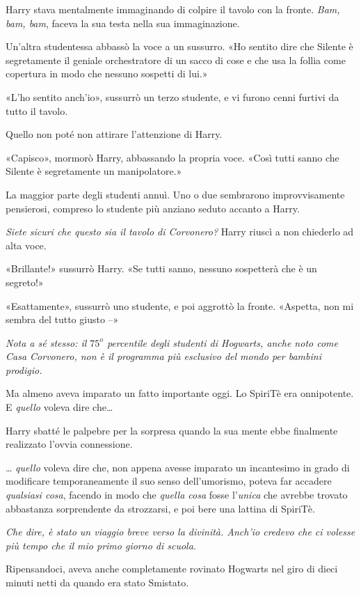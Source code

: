 Harry stava mentalmente immaginando di colpire il tavolo con la fronte. \textit{Bam, bam, bam}, faceva la sua testa nella sua immaginazione.

Un’altra studentessa abbassò la voce a un sussurro. «Ho sentito dire che Silente è segretamente il geniale orchestratore di un sacco di cose e che usa la follia come copertura in modo che nessuno sospetti di lui.»

«L’ho sentito anch’io», sussurrò un terzo studente, e vi furono cenni furtivi da tutto il tavolo.

Quello non poté non attirare l’attenzione di Harry.

«Capisco», mormorò Harry, abbassando la propria voce. «Così tutti sanno che Silente è segretamente un manipolatore.»

La maggior parte degli studenti annuì. Uno o due sembrarono improvvisamente pensierosi, compreso lo studente più anziano seduto accanto a Harry.

\textit{Siete sicuri che questo sia il tavolo di Corvonero?} Harry riuscì a non chiederlo ad alta voce.

«Brillante!» sussurrò Harry. «Se tutti sanno, nessuno sospetterà che è un segreto!»

«Esattamente», sussurrò uno studente, e poi aggrottò la fronte. «Aspetta, non mi sembra del tutto giusto –»

\textit{Nota a sé stesso: il $75^o$ percentile degli studenti di Hogwarts, anche noto come Casa Corvonero, non è il programma più esclusivo del mondo per bambini prodigio.}

Ma almeno aveva imparato un fatto importante oggi. Lo SpiriTè era onnipotente. E \textit{quello} voleva dire che…

Harry sbatté le palpebre per la sorpresa quando la sua mente ebbe finalmente realizzato l’ovvia connessione.

… \textit{quello} voleva dire che, non appena avesse imparato un incantesimo in grado di modificare temporaneamente il suo senso dell’umorismo, poteva far accadere \textit{qualsiasi cosa}, facendo in modo che \textit{quella cosa} fosse l’\textit{unica} che avrebbe trovato abbastanza sorprendente da strozzarsi, e poi bere una lattina di SpiriTè.

\textit{Che dire, è stato un viaggio breve verso la divinità. Anch’io credevo che ci volesse più tempo che il mio primo giorno di scuola.}

Ripensandoci, aveva anche completamente rovinato Hogwarts nel giro di dieci minuti netti da quando era stato Smistato.

